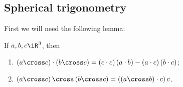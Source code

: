
	\pagebreak

\subsection{Spherical trigonometry} %
\label{sub:spherical_trigonometry}

First we will need the following lemma:

\begin{lemma}
	If $\va,\vb,\vc \iR^3$, then \label{lem:spher-trig} %
	\begin{enumerate}
		\shortskip
		\item $\left( \va\cross\vc \right) \cdot \left( \vb\cross\vc \right) = \left( \vc\cdot\vc \right) \left( \va\cdot\vb \right) - \left( \va\cdot\vc \right)\left( \vb\cdot\vc \right)$; %
		\item $\left( \va\cross\vc \right) \cross \left( \vb\cross\vc \right) = \left( \left( \va\cross\vb \right) \cdot \vc \right) \vc$. %
	\end{enumerate}
\end{lemma}

